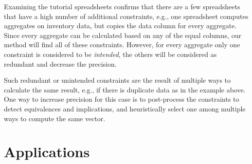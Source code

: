 Examining the tutorial spreadsheets confirms that there are a few spreadsheets that have a high number of additional constraints, e.g., one spreadsheet computes aggregates on inventory data, but copies the data column for every aggregate.
Since every aggregate can be calculated based on any of the equal columns, our method will find all of these constraints.
However, for every aggregate only one constraint is considered to be \textit{intended}, the others will be considered as redundant and decrease the precision.


Such redundant or unintended constraints are the result of multiple ways to calculate the same result, e.g., if there is duplicate data as in the example above.
One way to increase precision for this case is to post-process the constraints to detect equivalences and implications, and heuristically select one among multiple ways to compute the same vector.









\section{Applications}\label{sec:applications}





